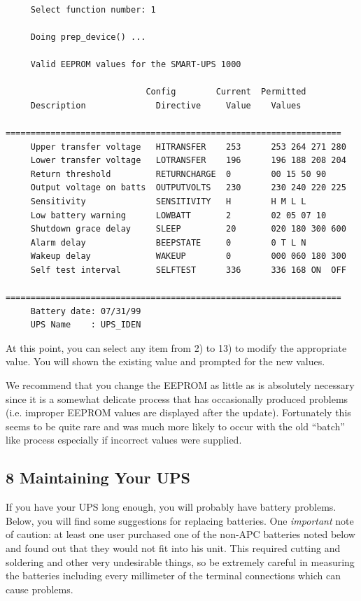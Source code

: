 \footnotesize
\begin{verbatim}
     
     Select function number: 1
     
     Doing prep_device() ...
     
     Valid EEPROM values for the SMART-UPS 1000
     
                            Config        Current  Permitted
     Description              Directive     Value    Values
     ===================================================================
     Upper transfer voltage   HITRANSFER    253      253 264 271 280
     Lower transfer voltage   LOTRANSFER    196      196 188 208 204
     Return threshold         RETURNCHARGE  0        00 15 50 90
     Output voltage on batts  OUTPUTVOLTS   230      230 240 220 225
     Sensitivity              SENSITIVITY   H        H M L L
     Low battery warning      LOWBATT       2        02 05 07 10
     Shutdown grace delay     SLEEP         20       020 180 300 600
     Alarm delay              BEEPSTATE     0        0 T L N
     Wakeup delay             WAKEUP        0        000 060 180 300
     Self test interval       SELFTEST      336      336 168 ON  OFF
     ===================================================================
     Battery date: 07/31/99
     UPS Name    : UPS_IDEN
\end{verbatim}
\normalsize

At this point, you can select any item from 2) to 13) to modify the
appropriate value. You will shown the existing value and prompted for the new
values.  

We recommend that you change the EEPROM as little as is absolutely necessary
since it is a somewhat delicate process that has occasionally produced
problems (i.e. improper EEPROM values are displayed after the update).
Fortunately this seems to be quite rare and was much more likely to occur with
the old ``batch'' like process especially if incorrect values were supplied. 

\label{Maintaining-Your-UPS}

\subsection*{8 Maintaining Your UPS}

\label{index-Maintenance-144}
If you have your UPS long enough, you will probably have battery problems.
Below, you will find some suggestions for replacing batteries. One {\it
important} note of caution: at least one user purchased one of the non-APC
batteries noted below and found out that they would not fit into his unit.
This required cutting and soldering and other very undesirable things, so be
extremely careful in measuring the batteries including every millimeter of the
terminal connections which can cause problems.  

